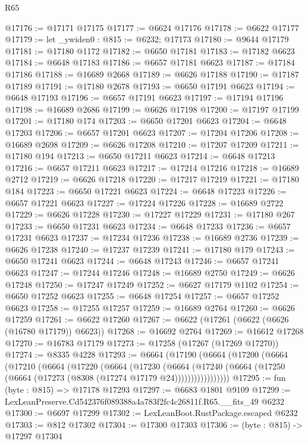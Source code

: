 \begin{lexlean}{R65}
\begin{coremodule}
{@17176 := @17171 @17175
@17177 := @6624 @17176
@17178 := @6622 @17177
@17179 := let _ywiden0 : @815 := @6232; @17173
@17180 := @9644 @17179
@17181 := @17180 @1172
@17182 := @6650 @17181
@17183 := @17182 @6623
@17184 := @6648 @17183
@17186 := @6657 @17181 @6623
@17187 := @17184 @17186
@17188 := @16689 @2668
@17189 := @6626 @17188
@17190 := @17187 @17189
@17191 := @17180 @2678
@17193 := @6650 @17191 @6623
@17194 := @6648 @17193
@17196 := @6657 @17191 @6623
@17197 := @17194 @17196
@17198 := @16689 @2686
@17199 := @6626 @17198
@17200 := @17197 @17199
@17201 := @17180 @174
@17203 := @6650 @17201 @6623
@17204 := @6648 @17203
@17206 := @6657 @17201 @6623
@17207 := @17204 @17206
@17208 := @16689 @2698
@17209 := @6626 @17208
@17210 := @17207 @17209
@17211 := @17180 @194
@17213 := @6650 @17211 @6623
@17214 := @6648 @17213
@17216 := @6657 @17211 @6623
@17217 := @17214 @17216
@17218 := @16689 @2712
@17219 := @6626 @17218
@17220 := @17217 @17219
@17221 := @17180 @184
@17223 := @6650 @17221 @6623
@17224 := @6648 @17223
@17226 := @6657 @17221 @6623
@17227 := @17224 @17226
@17228 := @16689 @2722
@17229 := @6626 @17228
@17230 := @17227 @17229
@17231 := @17180 @267
@17233 := @6650 @17231 @6623
@17234 := @6648 @17233
@17236 := @6657 @17231 @6623
@17237 := @17234 @17236
@17238 := @16689 @2736
@17239 := @6626 @17238
@17240 := @17237 @17239
@17241 := @17180 @179
@17243 := @6650 @17241 @6623
@17244 := @6648 @17243
@17246 := @6657 @17241 @6623
@17247 := @17244 @17246
@17248 := @16689 @2750
@17249 := @6626 @17248
@17250 := @17247 @17249
@17252 := @6627 @17179 @1102
@17254 := @6650 @17252 @6623
@17255 := @6648 @17254
@17257 := @6657 @17252 @6623
@17258 := @17255 @17257
@17259 := @16689 @2764
@17260 := @6626 @17259
@17261 := @6622 @17260
@17267 := @6622 (@17261 (@6622 (@6626 (@16780 @17179)) @6623))
@17268 := @16692 @2764
@17269 := @16612 @17268
@17270 := @16783 @17179
@17273 := @17258 (@17267 (@17269 @17270))
@17274 := @8335 @4228
@17293 := @6664
    (@17190
      (@6664
        (@17200
          (@6664
            (@17210
              (@6664
                (@17220
                  (@6664
                    (@17230
                      (@6664
                        (@17240
                          (@6664 (@17250 (@6664 (@17273 (@8308 (@17274 @17179 @24)))))))))))))))))
@17295 := fun (byte : @815) => @17178 @17293
@17297 := @6683 @1801 @9109
@17299 := LexLeanPreserve.Cd542376f089388a4a783f2fc4c26811f.R65.__fits_49 @6232
@17300 := @6697 @17299
@17302 := LexLeanBoot.RustPackage.escaped @6232
@17303 := @812 @17302
@17304 := @17300 @17303
@17306 := (byte : @815) -> @17297 @17304
}
\end{coremodule}
\end{lexlean}
